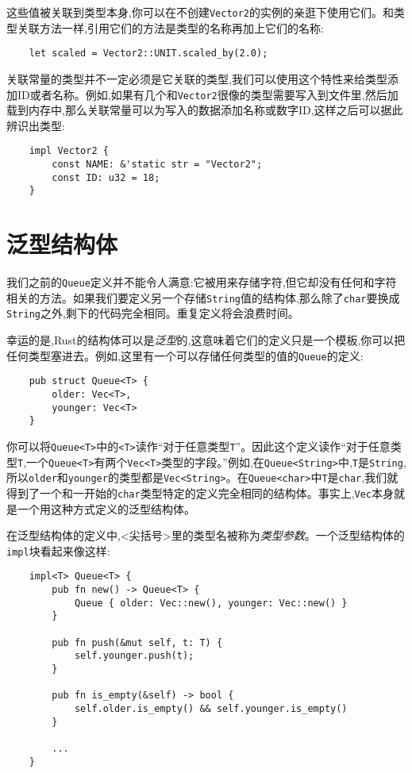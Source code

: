 这些值被关联到类型本身,你可以在不创建\texttt{Vector2}的实例的亲逛下使用它们。和类型关联方法一样,引用它们的方法是类型的名称再加上它们的名称:
\begin{verbatim}
    let scaled = Vector2::UNIT.scaled_by(2.0);
\end{verbatim}

关联常量的类型并不一定必须是它关联的类型,我们可以使用这个特性来给类型添加ID或者名称。例如,如果有几个和\texttt{Vector2}很像的类型需要写入到文件里,然后加载到内存中,那么关联常量可以为写入的数据添加名称或数字ID,这样之后可以据此辨识出类型:
\begin{verbatim}
    impl Vector2 {
        const NAME: &'static str = "Vector2";
        const ID: u32 = 18;
    }
\end{verbatim}

\section{泛型结构体}\label{GenStruct}

我们之前的\texttt{Queue}定义并不能令人满意:它被用来存储字符,但它却没有任何和字符相关的方法。如果我们要定义另一个存储\texttt{String}值的结构体,那么除了\texttt{char}要换成\texttt{String}之外,剩下的代码完全相同。重复定义将会浪费时间。

幸运的是,Rust的结构体可以是\emph{泛型}的,这意味着它们的定义只是一个模板,你可以把任何类型塞进去。例如,这里有一个可以存储任何类型的值的\texttt{Queue}的定义:
\begin{verbatim}
    pub struct Queue<T> {
        older: Vec<T>,
        younger: Vec<T>
    }
\end{verbatim}

你可以将\texttt{Queue<T>}中的\texttt{<T>}读作“对于任意类型\texttt{T}”。因此这个定义读作“对于任意类型\texttt{T},一个\texttt{Queue<T>}有两个\texttt{Vec<T>}类型的字段。”例如,在\texttt{Queue<String>}中,\texttt{T}是\texttt{String},所以\texttt{older}和\texttt{younger}的类型都是\texttt{Vec<String>}。在\texttt{Queue<char>}中\texttt{T}是\texttt{char},我们就得到了一个和一开始的\texttt{char}类型特定的定义完全相同的结构体。事实上,\texttt{Vec}本身就是一个用这种方式定义的泛型结构体。

在泛型结构体的定义中,<尖括号>里的类型名被称为\emph{类型参数}。一个泛型结构体的\texttt{impl}块看起来像这样:
\begin{verbatim}
    impl<T> Queue<T> {
        pub fn new() -> Queue<T> {
            Queue { older: Vec::new(), younger: Vec::new() }
        }

        pub fn push(&mut self, t: T) {
            self.younger.push(t);
        }

        pub fn is_empty(&self) -> bool {
            self.older.is_empty() && self.younger.is_empty()
        }

        ...
    }
\end{verbatim}

